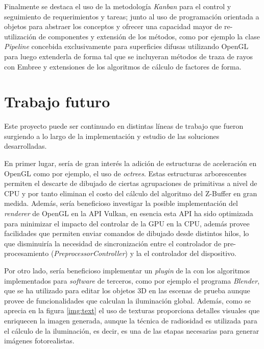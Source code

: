 Finalmente se destaca el uso de la metodología \textit{Kanban} para el control y seguimiento de requerimientos y tareas; junto al uso de programación orientada a objetos para abstraer los conceptos y ofrecer una capacidad mayor de re-utilización de componentes y extensión de los métodos, como por ejemplo la clase \textit{Pipeline} concebida exclusivamente para superficies difusas utilizando OpenGL para luego extenderla de forma tal que se incluyeran métodos de traza de rayos con Embree y extensiones de los algoritmos de cálculo de factores de forma. 

\section{Trabajo futuro}
\label{sec:futuro}

Este proyecto puede ser continuado en distintas líneas de trabajo que fueron surgiendo a lo largo de la implementación y estudio de las soluciones desarrolladas.

En primer lugar, sería de gran interés la adición de estructuras de aceleración en OpenGL como por ejemplo, el uso de \textit{octrees}. Estas estructuras arborescentes permiten el descarte de dibujado de ciertas agrupaciones de primitivas a nivel de CPU y por tanto eliminan el costo del cálculo del algoritmo del Z-Buffer en gran medida. Además, sería beneficioso investigar la posible implementación del \textit{renderer} de OpenGL en la API Vulkan, en esencia esta API ha sido optimizada para minimizar el impacto del controlar de la GPU en la CPU, además provee facilidades que permiten enviar comandos de dibujado desde distintos hilos, lo que disminuiría la necesidad de sincronización entre el controlador de pre-procesamiento (\textit{PreprocessorController}) y la el controlador del dispositivo.

Por otro lado, sería beneficioso implementar un \textit{plugin} de la con los algoritmos implementados para \textit{software} de terceros, como por ejemplo el programa \textit{Blender}, que se ha utilizado para editar los objetos 3D en las escenas de prueba aunque provee de funcionalidades que calculan la iluminación global. Además, como se aprecia en la figura \ref{img:text} el uso de texturas proporciona detalles visuales que enriquecen la imagen generada, aunque la técnica de radiosidad es utilizada para el cálculo de la iluminación, es decir, es una de las etapas necesarias para generar imágenes fotorealistas.

